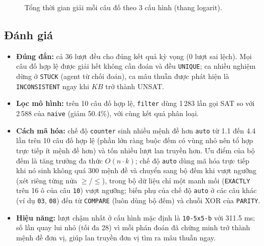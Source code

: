 \documentclass{article}
\newcommand{\code}[1]{\texttt{#1}}
\newcommand{\KB}{\mathit{KB}}
\begin{document}
\begin{figure}[H]
\centering
{}
\caption{Tổng thời gian giải mỗi câu đố theo 3 cấu hình (thang logarit).}
\end{figure}

\subsection{Đánh giá}
\begin{itemize}[noitemsep]
    \item \textbf{Đúng đắn:} cả 36 lượt đều cho đúng kết quả kỳ vọng (0 lượt sai lệch). Mọi câu đố hợp lệ được giải hết không cần đoán và đều \code{UNIQUE}; ca nhiều nghiệm dừng ở \code{STUCK} (agent từ chối đoán), ca mâu thuẫn được phát hiện là \code{INCONSISTENT} ngay khi $\KB$ trở thành UNSAT.
    \item \textbf{Lọc mô hình:} trên 10 câu đố hợp lệ, \code{filter} dùng 1\,283 lần gọi SAT so với 2\,588 của \code{naive} (giảm 50.4\%), với cùng kết quả phân loại.
    \item \textbf{Cách mã hóa:} chế độ \code{counter} sinh nhiều mệnh đề hơn \code{auto} từ 1.1 đến 4.4 lần trên 10 câu đố hợp lệ (phần lớn ràng buộc đếm có vùng nhỏ nên tổ hợp trực tiếp ít mệnh đề hơn) và tốn nhiều lượt lan truyền hơn. Ưu điểm của bộ đếm là tăng trưởng đa thức $O(n\cdot k)$; chế độ \code{auto} dùng mã hóa trực tiếp khi nó sinh không quá 300 mệnh đề và chuyển sang bộ đếm khi vượt ngưỡng (xét riêng từng nửa $\ge$/$\le$), trong bộ dữ liệu chỉ một manh mối (\code{EXACTLY} trên 16 ô của câu \code{10}) vượt ngưỡng; biến phụ của chế độ \code{auto} ở các câu khác (ví dụ \code{03}, \code{08}) đến từ \code{COMPARE} (luôn dùng bộ đếm) và chuỗi XOR của \code{PARITY}.
    \item \textbf{Hiệu năng:} lượt chậm nhất ở cấu hình mặc định là \code{10-5x5-b} với 311.5 ms; số lần quay lui nhỏ (tối đa 28) vì mỗi phán đoán đã chứng minh trở thành mệnh đề đơn vị, giúp lan truyền đơn vị tìm ra mâu thuẫn ngay.
\end{itemize}
\end{document}
